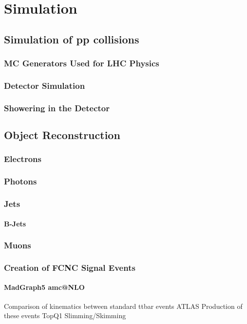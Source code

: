 \chapter{Simulation}
\label{ch:Simulation}

\section{Simulation of pp collisions}
\subsection{MC Generators Used for LHC Physics}
\subsection{Detector Simulation}
\subsection{Showering in the Detector}
\section{Object Reconstruction}
\subsection{Electrons}
\subsection{Photons}
\subsection{Jets}
\subsubsection{B-Jets}
\subsection{Muons}
\subsection{Creation of FCNC Signal Events}
\subsubsection{MadGraph5 amc@NLO}
Comparison of kinematics between standard ttbar events
ATLAS Production of these events
TopQ1 Slimming/Skimming





